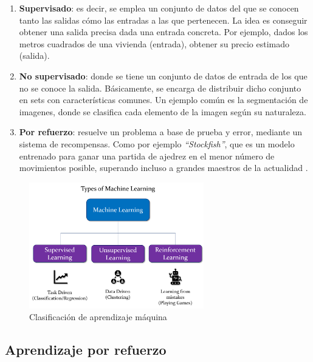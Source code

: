 \begin{enumerate}
	\item \textbf{Supervisado}: es decir, se emplea un conjunto de datos del que se conocen tanto las salidas cómo las entradas a las que pertenecen. La idea es conseguir obtener una salida precisa dada una entrada concreta. Por ejemplo, dados los metros cuadrados de una vivienda (entrada), obtener su precio estimado (salida).

	\item \textbf{No supervisado}: donde se tiene un conjunto de datos de entrada de los que no se conoce la salida. Básicamente, se encarga de distribuir dicho conjunto en sets con características comunes. Un ejemplo común es la segmentación de imagenes, donde se clasifica cada elemento de la imagen según su naturaleza.
	
    \item \textbf{Por refuerzo}: resuelve un problema a base de prueba y error, mediante un sistema de recompensas. Como por ejemplo \emph{``Stockfish''}, que es un modelo entrenado para ganar una partida de ajedrez en el menor número de movimientos posible, superando incluso a grandes maestros de la actualidad \cite{chess}.
\end{enumerate} \cite{reg-class} 

\begin{figure} [H]
	\begin{center}
	\includegraphics[height=5.5cm]{imagenes/cap1/8_AI_types.png}
	\end{center}
	\caption[Clasificación de aprendizaje máquina]{Clasificación de aprendizaje máquina}
	\label{fig:ai_types}
\end{figure}

\subsection{Aprendizaje por refuerzo}
\label{subsec:aprendizaje_por_refuerzo}

